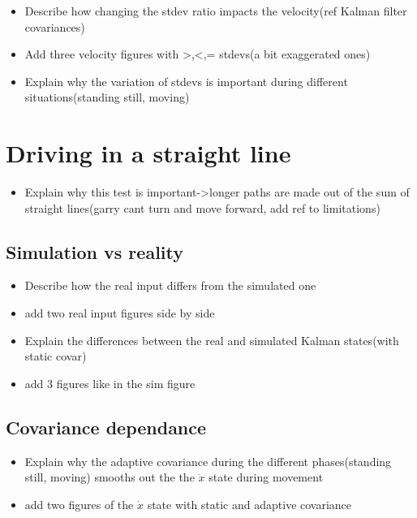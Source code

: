 \begin{itemize}
 \item Describe how changing the stdev ratio impacts the velocity(ref Kalman filter covariances)
 \item Add three velocity figures with >,<,= stdevs(a bit exaggerated ones)
 \item Explain why the variation of stdevs is important during different situations(standing still, moving)
\end{itemize}

\section{Driving in a straight line}\label{sec:straight_line}

\begin{itemize}
 \item Explain why this test is important->longer paths are made out of the sum of straight lines(garry cant turn and move forward, add ref to limitations)
\end{itemize}

\subsection{Simulation vs reality}\label{subsec:simvsreal}
\begin{itemize}
 \item Describe how the real input differs from the simulated one
 \item add two real input figures side by side
\end{itemize}
\hrulefill
\begin{itemize}
 \item Explain the differences between the real and simulated Kalman states(with static covar)
 \item add 3 figures like in the sim figure
\end{itemize}

\subsection{Covariance dependance}\label{subsec:covardep}
\begin{itemize}
 \item Explain why the adaptive covariance during the different phases(standing still, moving) smooths out the the $\dot{x}$ state during movement
 \item add two figures of the $\dot{x}$ state with static and adaptive covariance
\end{itemize}

